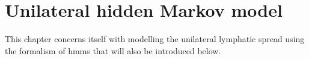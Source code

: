 \documentclass[\relativeRoot/main.tex]{subfiles}
\begin{document}
\chapter{Unilateral hidden Markov model}
\label{chap:unilateral}

This chapter concerns itself with modelling the unilateral lymphatic spread using the formalism of \glspl{hmm} that will also be introduced below.











\end{document}
